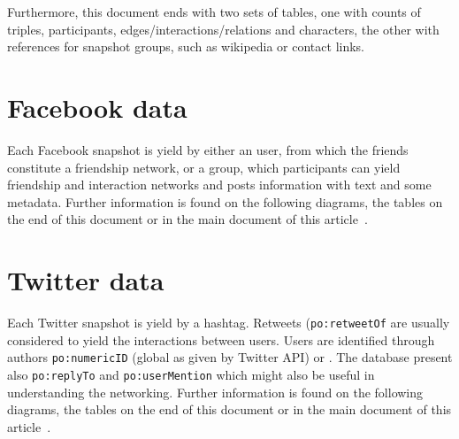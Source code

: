 \documentclass[review]{elsarticle}
\newcommand{\textttt}[1] {\texttt{\footnotesize#1}}
\begin{document}
Furthermore, this document ends with two sets of tables, one with counts of
triples, participants, edges/interactions/relations and characters,
the other with references for snapshot groups, such as wikipedia or
contact links.


\section{Facebook data}
Each Facebook snapshot is yield by either an user, from which the
friends constitute a friendship network, or a group, which participants
can yield friendship and interaction networks and posts information with
text and some metadata.
Further information is found on the following diagrams, the tables on
the end of this document or in the main document of this
article~\cite{losd}.

% 


\section{Twitter data}
Each Twitter snapshot is yield by a hashtag.
Retweets (\textttt{po:retweetOf} are usually considered to yield the interactions between users.
Users are identified through authors \textttt{po:numericID} (global as given by Twitter API)
or \textttt{}.
The database present also \textttt{po:replyTo} and \textttt{po:userMention}
which might also be useful in understanding the networking.
Further information is found on the following diagrams, the tables on
the end of this document or in the main document of this
article~\cite{losd}.

\pdfpageheight 4in

\end{document}
